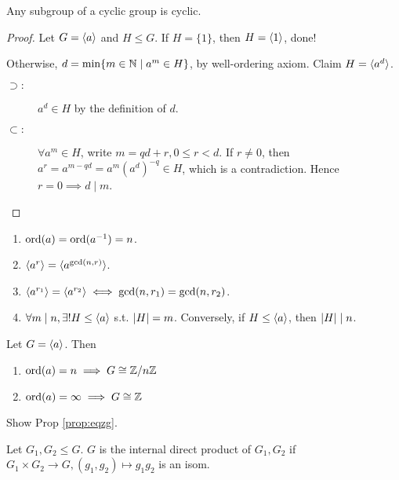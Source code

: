 \begin{prop}
  Any subgroup of a cyclic group is cyclic.
  \begin{proof}
    Let $G = \langle a\rangle$ and $H \le G$. If $H = \{1\}$, then
    $H = \langle1\rangle$, done!

    Otherwise, $d = \min \{ m \in \mathbb{N} \mid a^m \in H \}$, by well-ordering
    axiom. Claim $H = \langle a^d\rangle$.
    \begin{description}
      \item[$\supset:$] $a^d \in H$ by the definition of $d$.
      \item[$\subset:$] $\forall a^m \in H$, write $m = qd + r, 0 \le r < d$.
        If $r \ne 0$, then $a^r = a^{m - qd} = a^m (a^d)^{-q} \in H$, which
        is a contradiction. Hence $r = 0 \implies d \mid m$.
    \end{description}
  \end{proof}
\end{prop}

\begin{exercise} \mbox{}
  \begin{enumerate}
    \item $\operatorname{ord}(a) = \operatorname{ord}(a^{-1}) = n$.
    \item $\langle a^r\rangle = \langle a^{\gcd(n, r)}\rangle$.
    \item $\langle a^{r_1}\rangle = \langle a^{r_2}\rangle \iff \gcd(n, r_1) = \gcd(n, r_2)$.
    \item $\forall m \mid n, \exists! H \le \langle a\rangle$ s.t.
      $\lvert H\rvert = m$. Conversely, if $H \le \langle a\rangle$, then $\lvert H\rvert \mid n$.
  \end{enumerate}
\end{exercise}

\begin{prop}
  Let $G = \langle a\rangle$. Then
  \begin{enumerate}
    \item $\operatorname{ord}(a) = n \implies G \cong {\mathbb{Z}}/{n\mathbb{Z}}$
    \item $\operatorname{ord}(a) = \infty \implies G \cong \mathbb{Z}$
  \end{enumerate}
  \label{prop:eqzg}
  \begin{exercise}
    Show Prop \ref{prop:eqzg}.
  \end{exercise}
\end{prop}

\begin{definition}
  Let $G_1, G_2 \le G$. $G$ is the internal direct product of $G_1, G_2$ if
  $G_1 \times G_2 \to G, (g_1, g_2) \mapsto g_1g_2$ is an isom.
\end{definition}

